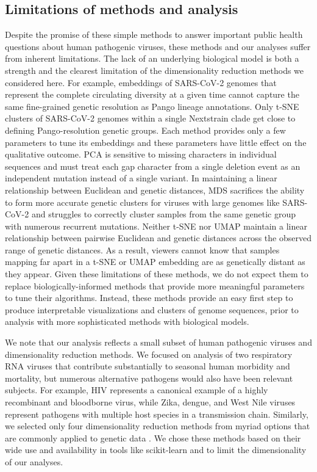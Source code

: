 \documentclass[webpdf,contemporary,large,single]{oup-authoring-template}%
\theoremstyle{thmstyleone}%
\theoremstyle{thmstyletwo}%
\theoremstyle{thmstylethree}%
\begin{document}
\subsection{Limitations of methods and analysis}

Despite the promise of these simple methods to answer important public health questions about human pathogenic viruses, these methods and our analyses suffer from inherent limitations.
The lack of an underlying biological model is both a strength and the clearest limitation of the dimensionality reduction methods we considered here.
For example, embeddings of SARS-CoV-2 genomes that represent the complete circulating diversity at a given time cannot capture the same fine-grained genetic resolution as Pango lineage annotations.
Only t-SNE clusters of SARS-CoV-2 genomes within a single Nextstrain clade get close to defining Pango-resolution genetic groups.
Each method provides only a few parameters to tune its embeddings and these parameters have little effect on the qualitative outcome.
PCA is sensitive to missing characters in individual sequences and must treat each gap character from a single deletion event as an independent mutation instead of a single variant.
In maintaining a linear relationship between Euclidean and genetic distances, MDS sacrifices the ability to form more accurate genetic clusters for viruses with large genomes like SARS-CoV-2 and struggles to correctly cluster samples from the same genetic group with numerous recurrent mutations.
Neither t-SNE nor UMAP maintain a linear relationship between pairwise Euclidean and genetic distances across the observed range of genetic distances.
As a result, viewers cannot know that samples mapping far apart in a t-SNE or UMAP embedding are as genetically distant as they appear.
Given these limitations of these methods, we do not expect them to replace biologically-informed methods that provide more meaningful parameters to tune their algorithms.
Instead, these methods provide an easy first step to produce interpretable visualizations and clusters of genome sequences, prior to analysis with more sophisticated methods with biological models.

We note that our analysis reflects a small subset of human pathogenic viruses and dimensionality reduction methods.
We focused on analysis of two respiratory RNA viruses that contribute substantially to seasonal human morbidity and mortality, but numerous alternative pathogens would also have been relevant subjects.
For example, HIV represents a canonical example of a highly recombinant and bloodborne virus, while Zika, dengue, and West Nile viruses represent pathogens with multiple host species in a transmission chain.
Similarly, we selected only four dimensionality reduction methods from myriad options that are commonly applied to genetic data \citep{Armstrong2022}.
We chose these methods based on their wide use and availability in tools like scikit-learn \citep{Pedregosa2011} and to limit the dimensionality of our analyses.
\end{document}
